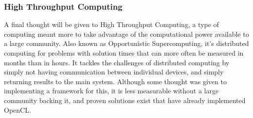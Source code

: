 \documentclass[../thesis.tex]{subfiles}
\begin{document}
        \subsubsection{High Throughput Computing} %
        \label{ssub:high_throughput_computing}
            A final thought will be given to High Throughput Computing, a type of computing meant more to take advantage of the computational power available to a large community. Also known as Opportunistic Supercomputing, it's distributed computing for problems with solution times that can more often be measured in months than in hours. It tackles the challenges of distributed computing by simply not having communication between individual devices, and simply returning results to the main system. Although some thought was given to implementing a framework for this, it is less measurable without a large community backing it, and proven solutions exist that have already implemented OpenCL\cite{boinc}. 
\end{document}
